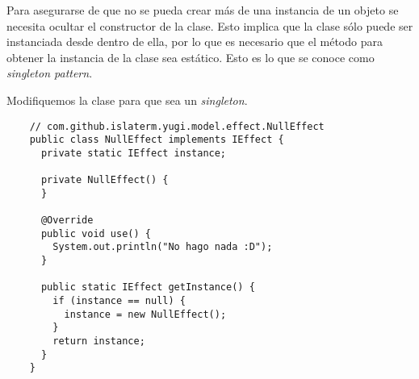\begin{Answer}[ref={ex:singleton-1}]
  Para asegurarse de que no se pueda crear más de una instancia de un objeto se necesita
  ocultar el constructor de la clase.
  Esto implica que la clase sólo puede ser instanciada desde dentro de ella, por lo que es
  necesario que el método para obtener la instancia de la clase sea estático.
  Esto es lo que se conoce como \textit{singleton pattern}.

  Modifiquemos la clase  para que sea un \textit{singleton}.
  \begin{verbatim}
    // com.github.islaterm.yugi.model.effect.NullEffect
    public class NullEffect implements IEffect {
      private static IEffect instance;

      private NullEffect() {
      }

      @Override
      public void use() {
        System.out.println("No hago nada :D");
      }

      public static IEffect getInstance() {
        if (instance == null) {
          instance = new NullEffect();
        }
        return instance;
      }
    }
  \end{verbatim}
\end{Answer}